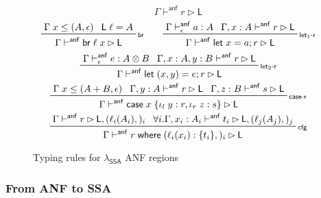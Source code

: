 \documentclass[acmsmall,screen,review]{acmart}
\newcommand{\ms}[1]{\ensuremath{\mathsf{#1}}}
\newcommand{\lto}{:}
\newcommand{\linl}[1]{\iota_l\;{#1}}
\newcommand{\linr}[1]{\iota_r\;{#1}}
\newcommand{\letstmt}[3]{\ensuremath{\ms{let}\;#1 = #2; #3}}
\newcommand{\brb}[2]{\ms{br}\;#1\;#2}
\newcommand{\casestmt}[5]{\ms{case}\;#1\;\{\linl{#2} \lto #3, \linr{#4} \lto #5\}}
\newcommand{\where}[2]{#1\;\ms{where}\;#2}
\newcommand{\wbranch}[3]{#1(#2) \lto \{#3\}}
\newcommand{\bhyp}[2]{#1 : #2}
\newcommand{\lhyp}[2]{#1(#2)}
\newcommand{\rle}[1]{{\scriptsize\textsf{#1}}}
\newcommand{\ahasty}[4]{#1 \vdash_{#2}^{\ms{anf}} #3 : {#4}}
\newcommand{\ahaslb}[3]{#1 \vdash^{\ms{anf}} #2 \rhd #3}
\newcommand{\isotopessa}{\(\lambda_{\ms{SSA}}\)}
\begin{document}
\begin{figure}
  \begin{equation*}
    \boxed{\ahaslb{\Gamma}{r}{\ms{L}}}
  \end{equation*}
  \begin{gather*}
    \prftree[r]{\rle{br}}{\Gamma\;x \leq (A, \epsilon)}{\ms{L}\;\ell = A}
      {\ahaslb{\Gamma}{\brb{\ell}{x}}{\ms{L}}} \qquad
    \prftree[r]{\rle{let$_1$-r}}
      {\ahasty{\Gamma}{\epsilon}{a}{A}}
      {\ahaslb{\Gamma, \bhyp{x}{A}}{r}{\ms{L}}}
      {\ahaslb{\Gamma}{\letstmt{x}{a}{r}}{\ms{L}}} \\
    \prftree[r]{\rle{let$_2$-r}}
      {\ahasty{\Gamma}{\epsilon}{e}{A \otimes B}}
      {\ahaslb{\Gamma, \bhyp{x}{A}, \bhyp{y}{B}}{r}{\ms{L}}}
      {\ahaslb{\Gamma}{\letstmt{(x, y)}{e}{r}}{\ms{L}}} \\
    \prftree[r]{\rle{case-r}}
      {\Gamma\;x \leq (A + B, \epsilon)}
      {\ahaslb{\Gamma, \bhyp{y}{A}}{r}{\ms{L}}}
      {\ahaslb{\Gamma, \bhyp{z}{B}}{s}{\ms{L}}}
      {\ahaslb{\Gamma}{\casestmt{x}{y}{r}{z}{s}}{\ms{L}}} \\
    \prftree[r]{\rle{cfg}}
      {\ahaslb{\Gamma}{r}{\ms{L}, (\lhyp{\ell_i}{A_i},)_i}}
      {\forall i. \ahaslb{\Gamma, \bhyp{x_i}{A_i}}{t_i}{\ms{L}, (\lhyp{\ell_j}{A_j},)_j}}
      {\ahaslb{\Gamma}{\where{r}{(\wbranch{\ell_i}{x_i}{t_i},)_i}}{\ms{L}}}
  \end{gather*}
  \caption{Typing rules for \isotopessa{} ANF regions}
  \Description{}
  \label{fig:ssa-anf}
\end{figure}

\subsubsection{From ANF to SSA}
\end{document}
